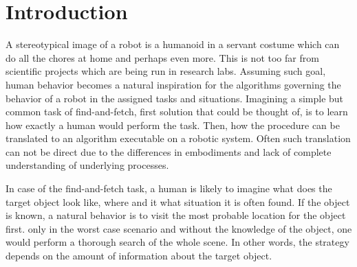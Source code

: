 \chapter{Introduction}
\label{Introduction.ch}
A stereotypical image of a robot is a humanoid in a servant costume which can do all the chores at home and perhaps even more. 
This is not too far from scientific projects which are being run in research labs. 
Assuming such goal, human behavior becomes a natural inspiration for the algorithms governing the behavior of a robot in the 
assigned tasks and situations.
Imagining a simple but common task of find-and-fetch, first solution that could be thought of, is to learn how exactly a human 
would perform the task. 
Then, how the procedure can be translated to an algorithm executable on a robotic system.
Often such translation can not be direct due to the differences in embodiments and lack of complete understanding of underlying 
processes. 

In case of the find-and-fetch task, a human is likely to imagine what does the target object look like, where and it what situation 
it is often found.
If the object is known, a natural behavior is to visit the most probable location for the object first.
only in the worst case scenario and without the knowledge of the object, one would perform a thorough search of the whole scene.
In other words, the strategy depends on the amount of information about the target object. 

